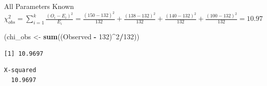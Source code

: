 \documentclass[
  ignorenonframetext,
]{beamer}
\newenvironment{Shaded}{\begin{snugshade}}{\end{snugshade}}
\newcommand{\AttributeTok}[1]{\textcolor[rgb]{0.13,0.29,0.53}{#1}}
\newcommand{\CommentTok}[1]{\textcolor[rgb]{0.56,0.35,0.01}{\textit{#1}}}
\newcommand{\DecValTok}[1]{\textcolor[rgb]{0.00,0.00,0.81}{#1}}
\newcommand{\FunctionTok}[1]{\textcolor[rgb]{0.13,0.29,0.53}{\textbf{#1}}}
\newcommand{\NormalTok}[1]{#1}
\newcommand{\OtherTok}[1]{\textcolor[rgb]{0.56,0.35,0.01}{#1}}
\newcommand{\SpecialCharTok}[1]{\textcolor[rgb]{0.81,0.36,0.00}{\textbf{#1}}}
\begin{document}
\begin{frame}[fragile]{All Parameters Known}
\protect\hypertarget{all-parameters-known-2}{}
\(\chi^2_{obs} = \sum_{i=1}^k\frac{(O_i - E_i)^2}{E_i} = \frac{(150 - 132)^2}{132} + \frac{(138 - 132)^2}{132} + \frac{(140 - 132)^2}{132} + \frac{(100 - 132)^2}{132} = 10.97\)

\begin{Shaded}
\begin{Highlighting}[]
\NormalTok{(chi\_obs }\OtherTok{\textless{}{-}} \FunctionTok{sum}\NormalTok{((Observed }\SpecialCharTok{{-}} \DecValTok{132}\NormalTok{)}\SpecialCharTok{\^{}}\DecValTok{2}\SpecialCharTok{/}\DecValTok{132}\NormalTok{))}
\end{Highlighting}
\end{Shaded}

\begin{verbatim}
[1] 10.9697
\end{verbatim}

\begin{Shaded}
\end{Shaded}

\begin{verbatim}
X-squared 
  10.9697 
\end{verbatim}
\end{frame}
\end{document}
